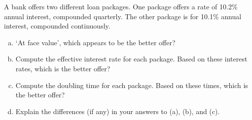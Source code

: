 \documentclass[11pt,letterpaper]{article}
\begin{document}
\newpage



 A bank offers two different loan packages. One package offers a rate of 10.2\% annual interest, compounded quarterly. The other package is for 10.1\% annual interest, compounded continuously. 
	\begin{enumerate}[(a)]
	\item `At face value', which appears to be the better offer?
	\item Compute the effective interest rate for each package. Based on these interest rates, which is the better offer?
	\item Compute the doubling time for each package. Based on these times, which is the better offer?
	\item Explain the differences (if any) in your answers to (a), (b), and (c). 
	\end{enumerate}
\end{document}

